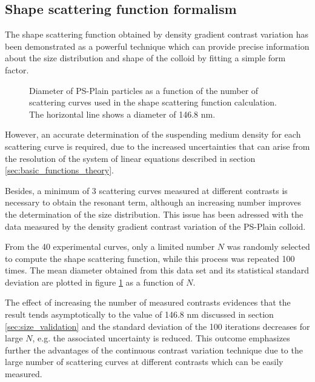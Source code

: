 \subsection{Shape scattering function formalism}
The shape scattering function obtained by density gradient contrast variation has been demonstrated as a powerful technique which can provide precise information about the size distribution and shape of the colloid by fitting a simple form factor.

\begin{figure}
	\begin{center}
		
	\end{center}
\caption[Diameter of PS-Plain particles obtained from the shape scattering function as a function of the number of scattering curves.]{Diameter of PS-Plain particles as a function of the number of scattering curves used in the shape scattering function calculation. The horizontal line shows a diameter of 146.8 nm.}
\label{fig:ResonantTermSimulationNumber}
\end{figure}

However, an accurate determination of the suspending medium density for each scattering curve is required, due to the increased uncertainties \citep{lefebvre_propagation_2000} that can arise from the resolution of the system of linear equations described in section \ref{sec:basic_functions_theory}.

Besides, a minimum of 3 scattering curves measured at different contrasts is necessary to obtain the resonant term, although an increasing number improves the determination of the size distribution. This issue has been adressed with the data measured by the density gradient contrast variation of the PS-Plain colloid. 

From the 40 experimental curves, only a limited number $N$ was randomly selected to compute the shape scattering function, while this process was repeated 100 times. The mean diameter obtained from this data set and its statistical standard deviation are plotted in figure \ref{fig:ResonantTermSimulationNumber} as a function of $N$.

The effect of increasing the number of measured contrasts evidences that the result tends asymptotically to the value of 146.8 nm discussed in section \ref{sec:size_validation} and the standard deviation of the 100 iterations decreases for large $N$, e.g. the associated uncertainty is reduced. This outcome emphasizes further the advantages of the continuous contrast variation technique due to the large number of scattering curves at different contrasts which can be easily measured.

